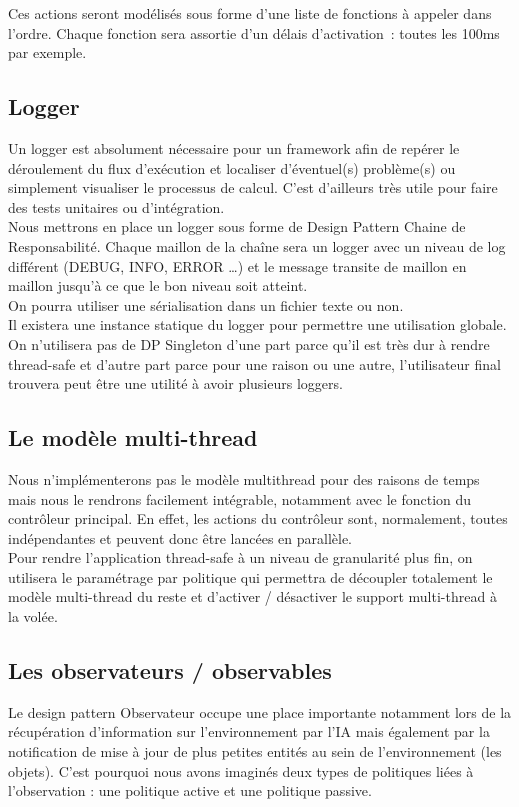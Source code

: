 Ces actions seront modélisés sous forme d'une liste de fonctions à appeler dans l'ordre. Chaque fonction sera assortie d'un délais d'activation~: toutes les 100ms par exemple.

\subsection{Logger}
Un logger est absolument nécessaire pour un framework afin de repérer le déroulement du flux d'exécution et localiser d'éventuel(s) problème(s) ou simplement visualiser le processus de calcul. C'est d'ailleurs très utile pour faire des tests unitaires ou d'intégration.\\
\indent Nous mettrons en place un logger sous forme de Design Pattern Chaine de Responsabilité. Chaque maillon de la chaîne sera un logger avec un niveau de log différent (DEBUG, INFO, ERROR \ldots ) et le message transite de maillon en maillon jusqu'à ce que le bon niveau soit atteint.\\
\indent On pourra utiliser une sérialisation dans un fichier texte ou non.\\

Il existera une instance statique du logger pour permettre une utilisation globale. On n'utilisera pas de DP Singleton d'une part parce qu'il est très dur à rendre thread-safe et d'autre part parce pour une raison ou une autre, l'utilisateur final trouvera peut être une utilité à avoir plusieurs loggers.

\subsection{Le modèle multi-thread}
Nous n'implémenterons pas le modèle multithread pour des raisons de temps mais nous le rendrons facilement intégrable, notamment avec le fonction du contrôleur principal. En effet, les actions du contrôleur sont, normalement, toutes indépendantes et peuvent donc être lancées en parallèle.\\

Pour rendre l'application thread-safe à un niveau de granularité plus fin, on utilisera le paramétrage par politique qui permettra de découpler totalement le modèle multi-thread du reste et d'activer / désactiver le support multi-thread à la volée.

\subsection{Les observateurs / observables}
Le design pattern Observateur occupe une place importante notamment lors de la récupération d'information sur l'environnement par l'IA mais également par la notification de mise à jour de plus petites entités au sein de l'environnement (les objets). C'est pourquoi nous avons imaginés deux types de politiques liées à l'observation : une politique active et une politique passive.

